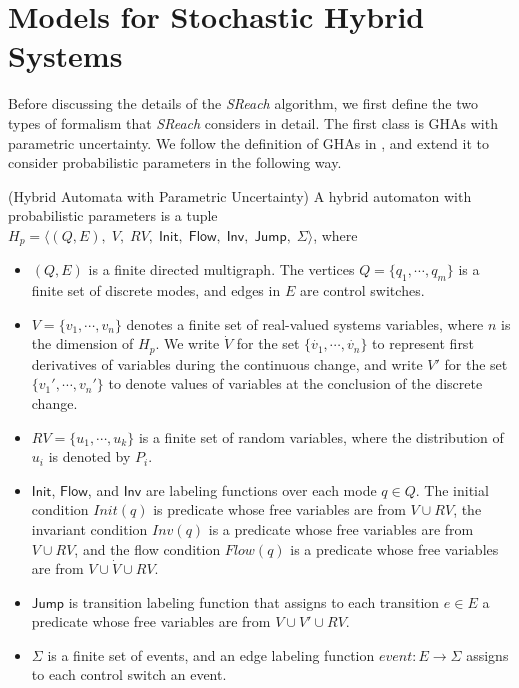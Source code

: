 \section{Models for Stochastic Hybrid Systems}
Before discussing the details of the {\it SReach} algorithm, we first define the two types of formalism that {\it SReach} considers in detail. The first class is GHAs with parametric uncertainty. We follow the definition of GHAs in \cite{henzinger2000theory}, and extend it to consider probabilistic parameters in the following way.
\vspace{-.4cm}
\begin{definition}
\label{def:ha_para}
{\rm(Hybrid Automata with Parametric Uncertainty)} A hybrid automaton with probabilistic parameters is a tuple $H_p = \langle (Q, E), \;V, \;RV, \; \mathsf{Init},\; \mathsf{Flow}, \; \mathsf{Inv}, \; \mathsf{Jump}, \; \Sigma \rangle$, where
\vspace{-.4cm}
\begin{itemize}
\item $(Q, E)$ is a finite directed multigraph. The vertices $Q=\{q_1, \cdots,q_m\}$ is a finite set of discrete modes, and edges in $E$ are control switches.
\vspace{-.2cm}
\item $V = \{ v_1, \cdots, v_n \}$ denotes a finite set of real-valued systems variables, where $n$ is the dimension of $H_p$. We write $\dot{V}$ for the set $\{\dot{v_1}, \cdots, \dot{v_n}\}$ to represent first derivatives of variables during the continuous change, and write $V'$ for the set $\{v_1', \cdots, v_n'\}$ to denote values of variables at the conclusion of the discrete change.
\vspace{-.2cm}
\item $RV = \{ u_1, \cdots, u_k \}$ is a finite set of random variables, where the distribution of $u_i$ is denoted by $P_i$.
\vspace{-.2cm}
\item $\mathsf{Init}$, $\mathsf{Flow}$, and $\mathsf{Inv}$ are labeling functions over each mode $q \in Q$. The initial condition $Init(q)$ is predicate whose free variables are from $V \cup RV$, the invariant condition $Inv(q)$ is a predicate whose free variables are from $V \cup RV$, and the flow condition $Flow(q)$ is a predicate whose free variables are from $V \cup \dot{V} \cup RV$.
\vspace{-.2cm}
\item $\mathsf{Jump}$ is transition labeling function that assigns to each transition $e \in E$ a predicate whose free variables are from $V \cup V' \cup RV$.
\vspace{-.2cm}
\item $\Sigma$ is a finite set of events, and an edge labeling function $event: E \to \Sigma$ assigns to each control switch an event. 
\end{itemize}
\end{definition}
